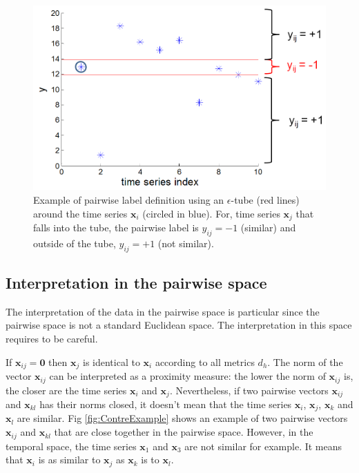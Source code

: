 \begin{figure}[h!]
\centering
\includegraphics[width=0.65\linewidth]{images/pairwise_label_tube}
\caption{Example of pairwise label definition using an $\epsilon$-tube (red lines) around the time series $\textbf{x}_i$ (circled in blue). For, time series $\textbf{x}_j$ that falls into the tube, the pairwise label is $y_{ij} = -1$ (similar) and outside of the tube, $y_{ij} = +1$ (not similar).}
\label{fig:pairwise_label_tube}
\end{figure}


\subsection{Interpretation in the pairwise space}

The interpretation of the data in the pairwise space is particular since the pairwise space is not a standard Euclidean space. The interpretation in this space requires to be careful.

If $\textbf{x}_{ij}=\textbf{0}$ then $\textbf{x}_{j}$ is identical to $\textbf{x}_{i}$ according to all metrics $d_h$. The norm of the vector $\textbf{x}_{ij}$ can be interpreted as a proximity measure: the lower the norm of $\textbf{x}_{ij}$ is, the closer are the time series $\textbf{x}_{i}$ and $\textbf{x}_{j}$. Nevertheless, if two pairwise vectors $\textbf{x}_{ij}$ and $\textbf{x}_{kl}$ has their norms closed, it doesn't mean that the time series $\textbf{x}_{i}$, $\textbf{x}_{j}$, $\textbf{x}_{k}$ and $\textbf{x}_{l}$ are similar. Fig \ref{fig:ContreExample} shows an example of two pairwise vectors $\textbf{x}_{ij}$ and $\textbf{x}_{kl}$ that are close together in the pairwise space. However, in the temporal space, the time series $\textbf{x}_{1}$ and $\textbf{x}_{3}$ are not similar for example. It means that $\textbf{x}_i$ is as similar to $\textbf{x}_j$ as $\textbf{x}_k$ is to $\textbf{x}_l$.

